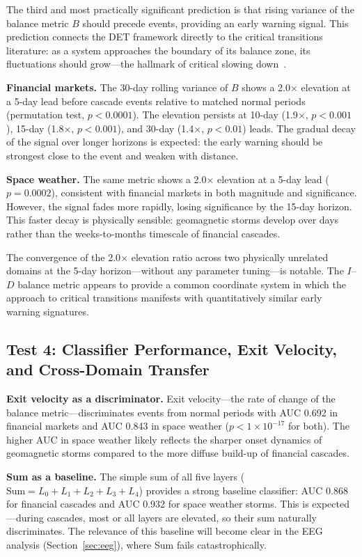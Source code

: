 \documentclass[aip,cha,reprint,amsmath,amssymb]{revtex4-2}
\begin{document}
The third and most practically significant prediction is that rising variance of the balance metric $B$ should precede events, providing an early warning signal. This prediction connects the DET framework directly to the critical transitions literature: as a system approaches the boundary of its balance zone, its fluctuations should grow---the hallmark of critical slowing down~\cite{scheffer2009,dakos2012}.

\textbf{Financial markets.} The 30-day rolling variance of $B$ shows a 2.0$\times$ elevation at a 5-day lead before cascade events relative to matched normal periods (permutation test, $p < 0.0001$). The elevation persists at 10-day (1.9$\times$, $p < 0.001$), 15-day (1.8$\times$, $p < 0.001$), and 30-day (1.4$\times$, $p < 0.01$) leads. The gradual decay of the signal over longer horizons is expected: the early warning should be strongest close to the event and weaken with distance.

\textbf{Space weather.} The same metric shows a 2.0$\times$ elevation at a 5-day lead ($p = 0.0002$), consistent with financial markets in both magnitude and significance. However, the signal fades more rapidly, losing significance by the 15-day horizon. This faster decay is physically sensible: geomagnetic storms develop over days rather than the weeks-to-months timescale of financial cascades.

The convergence of the 2.0$\times$ elevation ratio across two physically unrelated domains at the 5-day horizon---without any parameter tuning---is notable. The $I$--$D$ balance metric appears to provide a common coordinate system in which the approach to critical transitions manifests with quantitatively similar early warning signatures.

\subsection{Test 4: Classifier Performance, Exit Velocity, and Cross-Domain Transfer}

\textbf{Exit velocity as a discriminator.} Exit velocity---the rate of change of the balance metric---discriminates events from normal periods with AUC 0.692 in financial markets and AUC 0.843 in space weather ($p < 1 \times 10^{-17}$ for both). The higher AUC in space weather likely reflects the sharper onset dynamics of geomagnetic storms compared to the more diffuse build-up of financial cascades.

\textbf{Sum as a baseline.} The simple sum of all five layers ($\text{Sum} = L_0 + L_1 + L_2 + L_3 + L_4$) provides a strong baseline classifier: AUC 0.868 for financial cascades and AUC 0.932 for space weather storms. This is expected---during cascades, most or all layers are elevated, so their sum naturally discriminates. The relevance of this baseline will become clear in the EEG analysis (Section~\ref{sec:eeg}), where Sum fails catastrophically.
\end{document}
